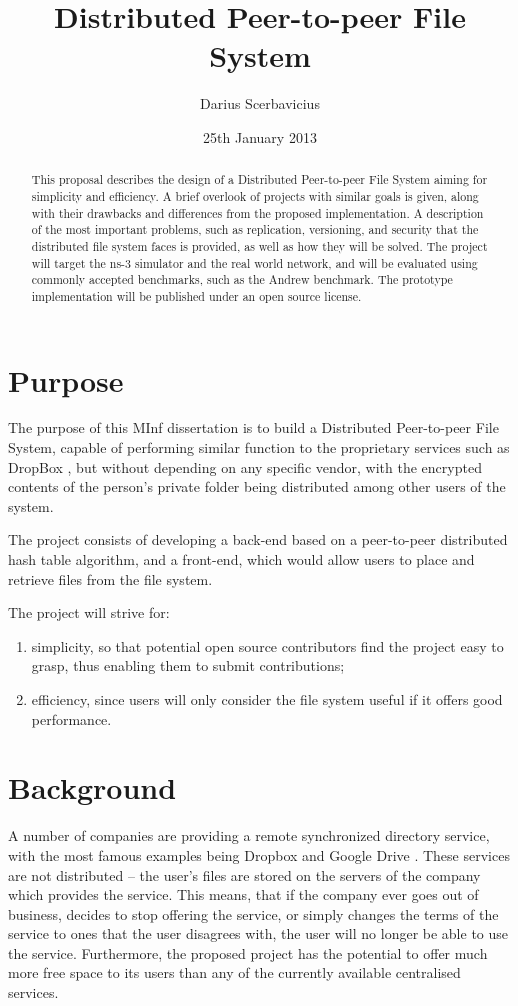 \documentclass[8pt,a4paper]{article}
\title{Distributed Peer-to-peer File System}
\author{Darius Scerbavicius}
\date{25th January 2013}
\begin{document}
\maketitle

\begin{abstract}
This proposal describes the design of a Distributed Peer-to-peer File System aiming for simplicity and efficiency. A brief overlook of projects with similar goals is given, along with their drawbacks and differences from the proposed implementation. A description of the most important problems, such as replication, versioning, and security that the distributed file system faces is provided, as well as how they will be solved. The project will target the ns-3 simulator and the real world network, and will be evaluated using commonly accepted benchmarks, such as the Andrew benchmark. The prototype implementation will be published under an open source license.
\end{abstract}

\section{Purpose}
The purpose of this MInf dissertation is to build a Distributed Peer-to-peer File System, capable of performing similar function to the proprietary services such as DropBox \cite{dropbox}, but without depending on any specific vendor, with the encrypted contents of the person's private folder being distributed among other users of the system. 

The project consists of developing a back-end based on a peer-to-peer distributed hash table algorithm, and a front-end, which would allow users to place and retrieve files from the file system.

The project will strive for:
\begin{enumerate}
\item simplicity, so that potential open source contributors find the project easy to grasp, thus enabling them to submit contributions;
\item efficiency, since users will only consider the file system useful if it offers good performance.
\end{enumerate}

\section{Background}

A number of companies are providing a remote synchronized directory service, with the most famous examples being Dropbox \cite{dropbox} and Google Drive \cite{gdrive}. These services are not distributed -- the user's files are stored on the servers of the company which provides the service. This means, that if the company ever goes out of business, decides to stop offering the service, or simply changes the terms of the service to ones that the user disagrees with, the user will no longer be able to use the service. 
Furthermore, the proposed project has the potential to offer much more free space to its users than any of the currently available centralised services.
\end{document}
